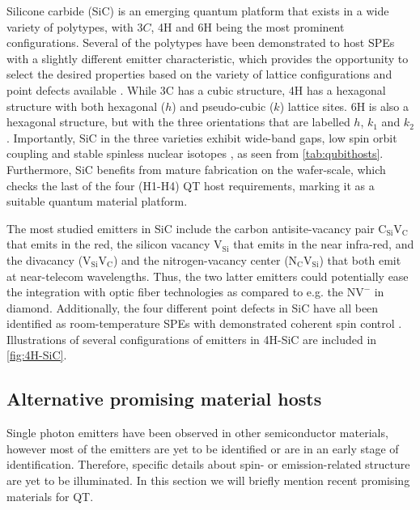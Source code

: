 Silicone carbide (SiC) is an emerging quantum platform that exists in a wide variety of polytypes, with $3C$, 4H and 6H being the most prominent configurations. Several of the polytypes have been demonstrated to host SPEs with a slightly different emitter characteristic, which provides the opportunity to select the desired properties based on the variety of lattice configurations and point defects available \cite{Weber2010, Son2020, Falk2013}. While 3C has a cubic structure, 4H has a hexagonal structure with both hexagonal ($h$) and pseudo-cubic ($k$) lattice sites. 6H is also a hexagonal structure, but with the three orientations that are labelled $h$, $k_1$ and $k_2$. Importantly, SiC in the three varieties exhibit wide-band gaps, low spin orbit coupling and stable spinless nuclear isotopes \cite{Neudeck1995, Weber2010, Martienssen2005}, as seen from \autoref{tab:qubithosts}. Furthermore, SiC benefits from mature fabrication on the wafer-scale, which checks the last of the four (H1-H4) QT host requirements, marking it as a suitable quantum material platform.


The most studied emitters in SiC include the carbon antisite-vacancy pair $\text{C}_{\text{Si}}\text{V}_{\text{C}}$ that emits in the red, the silicon vacancy $\text{V}_{\text{Si}}$ that emits in the near infra-red, and the divacancy ($\text{V}_{\text{Si}}\text{V}_{\text{C}}$) and the nitrogen-vacancy center ($\text{N}_{\text{C}}\text{V}_{\text{Si}}$) that both emit at near-telecom wavelengths. Thus, the two latter emitters could potentially ease the integration with optic fiber technologies as compared to e.g. the $\text{NV}^{-}$ in diamond. Additionally, the four different point defects in SiC have all been identified as room-temperature SPEs with demonstrated coherent spin control \cite{Widmann2014, Kraus2013, Castelletto2013, Koehl2011, Bathen2019}. Illustrations of several configurations of emitters in 4H-SiC are included in \autoref{fig:4H-SiC}.

\subsection{Alternative promising material hosts}
\label{promising-material-hosts}

Single photon emitters have been observed in other semiconductor materials, however most of the emitters are yet to be identified or are in an early stage of identification. Therefore, specific details about spin- or emission-related structure are yet to be illuminated. In this section we will briefly mention recent promising materials for QT.

